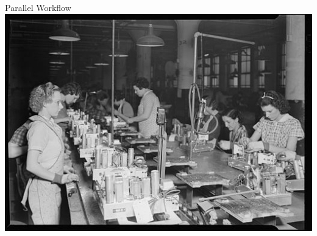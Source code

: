 \documentclass[9pt,pdftex]{beamer}
\begin{document}
\begin{frame}
\begin{columns}[t]
\begin{column}{.45\textwidth}
\begin{block}{Parallel  Workflow}
      \includegraphics[width=.9\textwidth]{img/RadioAssembly}
      \end{block}
    \end{column}
  \end{columns}
  \vfill
\end{frame}

\maketitle
\end{document}
